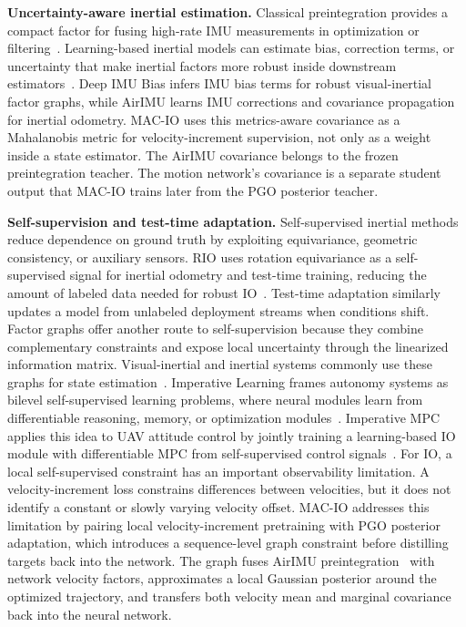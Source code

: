 \textbf{Uncertainty-aware inertial estimation.}
Classical preintegration provides a compact factor for fusing high-rate IMU measurements in optimization or filtering~\cite{forster2015imu}.
Learning-based inertial models can estimate bias, correction terms, or uncertainty that make inertial factors more robust inside downstream estimators~\cite{buchanan2022deep, qiu2023airimu}.
Deep IMU Bias infers IMU bias terms for robust visual-inertial factor graphs, while AirIMU learns IMU corrections and covariance propagation for inertial odometry.
MAC-IO uses this metrics-aware covariance as a Mahalanobis metric for velocity-increment supervision, not only as a weight inside a state estimator.
The AirIMU covariance belongs to the frozen preintegration teacher.
The motion network's covariance is a separate student output that MAC-IO trains later from the PGO posterior teacher.

\textbf{Self-supervision and test-time adaptation.}
Self-supervised inertial methods reduce dependence on ground truth by exploiting equivariance, geometric consistency, or auxiliary sensors.
RIO uses rotation equivariance as a self-supervised signal for inertial odometry and test-time training, reducing the amount of labeled data needed for robust IO~\cite{cao2022rio}.
Test-time adaptation similarly updates a model from unlabeled deployment streams when conditions shift.
Factor graphs offer another route to self-supervision because they combine complementary constraints and expose local uncertainty through the linearized information matrix.
Visual-inertial and inertial systems commonly use these graphs for state estimation~\cite{wang2023pypose}.
Imperative Learning frames autonomy systems as bilevel self-supervised learning problems, where neural modules learn from differentiable reasoning, memory, or optimization modules~\cite{wang2024imperative}.
Imperative MPC applies this idea to UAV attitude control by jointly training a learning-based IO module with differentiable MPC from self-supervised control signals~\cite{he2025imperative}.
For IO, a local self-supervised constraint has an important observability limitation.
A velocity-increment loss constrains differences between velocities, but it does not identify a constant or slowly varying velocity offset.
MAC-IO addresses this limitation by pairing local velocity-increment pretraining with PGO posterior adaptation, which introduces a sequence-level graph constraint before distilling targets back into the network.
The graph fuses AirIMU preintegration~\cite{qiu2023airimu} with network velocity factors, approximates a local Gaussian posterior around the optimized trajectory, and transfers both velocity mean and marginal covariance back into the neural network.

